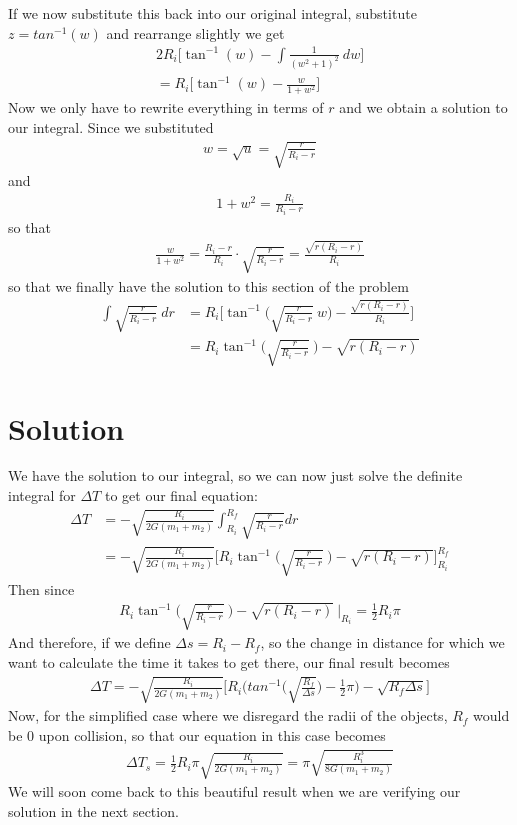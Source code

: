 \documentclass{article}
\begin{document}
If we now substitute this back into our original integral, substitute $z = tan^{-1}(w)$ and rearrange slightly we get
\begin{align}
    2R_i \Biggl[ \tan^{-1}(w) - \int \frac{1}{(w^2 + 1)^2} ~dw \Biggr]\\
    = R_i \Biggl[ \tan^{-1}(w) - \frac{w}{1+w^2}\Biggr]
\end{align}
Now we only have to rewrite everything in terms of $r$ and we obtain a solution to our integral. Since
we substituted
\begin{align}
    w = \sqrt{u} = \sqrt{\frac{r}{R_i - r}}
\end{align}
and
\begin{align}
    {1+w^2} = \frac{R_i}{R_i - r} 
\end{align}
so that
\begin{align}
    \frac{w}{1+w^2} = \frac{R_i - r}{R_i} \cdot \sqrt{\frac{r}{R_i-r}} = \frac{\sqrt{r( R_i - r)}}{R_i} 
\end{align}
so that we finally have the solution to this section of the problem
\begin{align}
    \int \sqrt{\frac{r}{R_i - r}} ~ dr &= R_i \Biggl[ \tan^{-1}\biggl(\sqrt{\frac{r}{R_i - r}}~w\biggr) - \frac{\sqrt{r( R_i - r)}}{R_i}  \Biggr]\\
    &= R_i \tan^{-1}\biggl(\sqrt{\frac{r}{R_i - r}} ~ \biggr) -\sqrt{r( R_i - r)}
\end{align}
\section{Solution}
We have the solution to our integral, so we can now just solve the definite integral for $\Delta T$ to get our final equation:
\begin{align}
\Delta T &=  - \sqrt{\frac{R_i}{2G(m_1 + m_2)}} \int_{R_i}^{R_f} \sqrt{\frac{r}{R_i - r}} dr\\
&=   - \sqrt{\frac{R_i}{2G(m_1 + m_2)}} \biggl[  R_i \tan^{-1}\biggl(\sqrt{\frac{r}{R_i - r}} ~ \biggr) -\sqrt{r( R_i - r)} \biggr]_{R_i}^{R_f}
\end{align}
Then since
\begin{align}
     R_i \tan^{-1}\biggl(\sqrt{\frac{r}{R_i - r}} ~ \biggr) -\sqrt{r( R_i - r)} ~ \bigg|_{R_i} = \frac{1}{2} R_i \pi
\end{align}
And therefore, if we define $\Delta s = R_i - R_f$, so the change in distance for which we want to calculate the time it takes to get there, our final result becomes
\begin{align}
    \Delta T =  - \sqrt{\frac{R_i}{2G(m_1 + m_2)}} \biggl[ R_i \biggl( tan^{-1}\biggl(\sqrt{\frac{R_f}{ \Delta s}}\biggr) - \frac{1}{2}\pi \biggr) - \sqrt{R_f \Delta s } \biggr]
\end{align}
Now, for the simplified case where we disregard the radii of the objects, $R_f$ would be $0$ upon collision, so that our equation in this case becomes
\begin{align}
    \Delta T_{s} =  \frac{1}{2} R_i \pi \sqrt{\frac{R_i}{2G(m_1 + m_2)}} = \pi \sqrt{\frac{R_i^3}{8G(m_1 + m_2)}}
\end{align}
We will soon come back to this beautiful result when we are verifying our solution in the next section.
\end{document}
